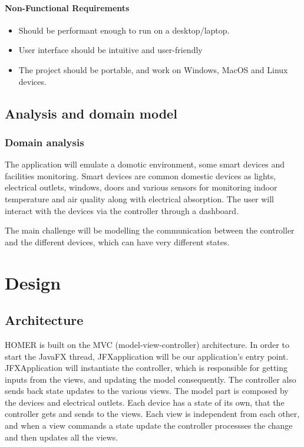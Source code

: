\documentclass[a4paper,12pt]{report}
\begin{document}
\subsubsection{Non-Functional Requirements}

\begin{itemize}
	\item Should be performant enough to run on a desktop/laptop.
	\item User interface should be intuitive and user-friendly
	\item The project should be portable, and work on Windows, MacOS and Linux devices.
\end{itemize}

\section{Analysis and domain model}
\subsection[]{Domain analysis}

The application will emulate a domotic environment, some smart devices and facilities monitoring.
Smart devices are common domestic devices as lights, electrical outlets, windows, doors and various sensors 
for monitoring indoor temperature and air quality along with electrical absorption.
The user will interact with the devices via the controller through a dashboard.

The main challenge will be modelling the communication between the controller 
and the different devices, which can have very different states.

\chapter{Design}
\section{Architecture}

HOMER is built on the MVC (model-view-controller) architecture. 
In order to start the JavaFX thread, JFXapplication will be our application's entry point.
JFXApplication will instantiate the controller, which is responsible for getting inputs from the views,
and updating the model consequently. The controller also sends back state updates to the various views.
The model part is composed by the devices and electrical outlets. Each device has a state of its own, that
the controller gets and sends to the views. 
Each view is independent from each other, and when a view commands a state update
the controller processses the change and then updates all the views.
\end{document}

